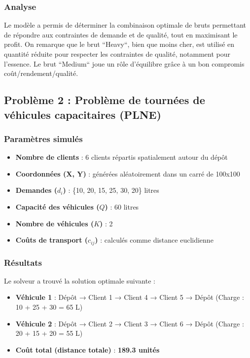 \documentclass[a4paper,11pt]{article}
\begin{document}
\subsubsection*{Analyse}

Le modèle a permis de déterminer la combinaison optimale de bruts permettant de répondre aux contraintes de demande et de qualité, tout en maximisant le profit. On remarque que le brut ``Heavy``, bien que moins cher, est utilisé en quantité réduite pour respecter les contraintes de qualité, notamment pour l’essence. Le brut ``Medium`` joue un rôle d’équilibre grâce à un bon compromis coût/rendement/qualité.

\vspace{0.5cm}

\subsection{Problème 2 : Problème de tournées de véhicules capacitaires (PLNE)}

\subsubsection*{Paramètres simulés}

\begin{itemize}
    \item \textbf{Nombre de clients} : 6 clients répartis spatialement autour du dépôt
    \item \textbf{Coordonnées (X, Y)} : générées aléatoirement dans un carré de 100x100
    \item \textbf{Demandes ($d_i$)} : \{10, 20, 15, 25, 30, 20\} litres
    \item \textbf{Capacité des véhicules ($Q$)} : 60 litres
    \item \textbf{Nombre de véhicules ($K$)} : 2
    \item \textbf{Coûts de transport ($c_{ij}$)} : calculés comme distance euclidienne
\end{itemize}

\subsubsection*{Résultats}

Le solveur a trouvé la solution optimale suivante :

\begin{itemize}
    \item \textbf{Véhicule 1} : Dépôt → Client 1 → Client 4 → Client 5 → Dépôt (Charge : 10 + 25 + 30 = 65 L)
    \item \textbf{Véhicule 2} : Dépôt → Client 2 → Client 3 → Client 6 → Dépôt (Charge : 20 + 15 + 20 = 55 L)
    \item \textbf{Coût total (distance totale)} : \textbf{189.3 unités}
\end{itemize}
\end{document}
